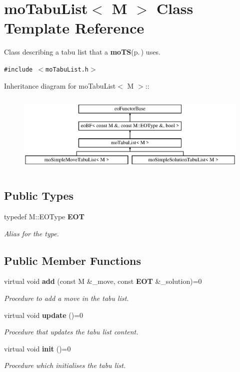 \section{mo\-Tabu\-List$<$ M $>$ Class Template Reference}
\label{classmo_tabu_list}
Class describing a tabu list that a {\bf mo\-TS}{\rm (p.\,\pageref{classmo_t_s})} uses.  


{\tt \#include $<$mo\-Tabu\-List.h$>$}

Inheritance diagram for mo\-Tabu\-List$<$ M $>$::\begin{figure}[H]
\begin{center}
\leavevmode
\includegraphics[height=3.88889cm]{classmo_tabu_list}
\end{center}
\end{figure}
\subsection*{Public Types}
\begin{CompactItemize}
\item 
typedef M::EOType {\bf EOT}\label{classmo_tabu_list_w0}

\begin{CompactList}\small\item\em Alias for the type. \item\end{CompactList}\end{CompactItemize}
\subsection*{Public Member Functions}
\begin{CompactItemize}
\item 
virtual void {\bf add} (const M \&\_\-move, const {\bf EOT} \&\_\-solution)=0
\begin{CompactList}\small\item\em Procedure to add a move in the tabu list. \item\end{CompactList}\item 
virtual void {\bf update} ()=0
\begin{CompactList}\small\item\em Procedure that updates the tabu list content. \item\end{CompactList}\item 
virtual void {\bf init} ()=0
\begin{CompactList}\small\item\em Procedure which initialises the tabu list. \item\end{CompactList}\end{CompactItemize}


